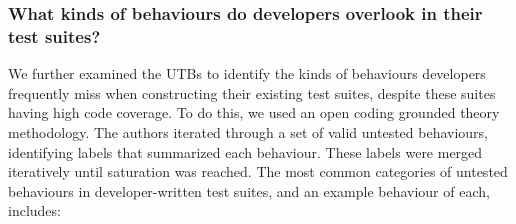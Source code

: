 
\smallskip
\subsubsection{What kinds of behaviours do developers overlook in their test suites?} 
We further examined the UTBs to identify the kinds of behaviours developers frequently miss when constructing their existing test suites, despite these suites having high code coverage. %
To do this, we used an open coding grounded theory methodology. The authors iterated through a set of valid untested behaviours, identifying labels that summarized each behaviour.
These labels were merged iteratively until saturation was reached. %
The most common categories of untested behaviours in developer-written test suites, and an example behaviour of each, includes: 



